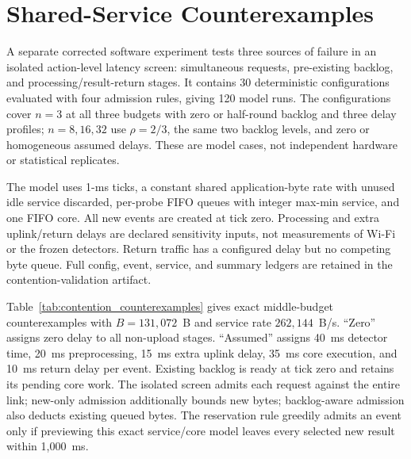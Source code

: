 \documentclass[10pt,onecolumn]{IEEEtran}
\begin{document}
\section{Shared-Service Counterexamples}
\label{sec:contention_validation}
A separate corrected software experiment tests three sources of failure in
an isolated action-level latency screen: simultaneous requests, pre-existing
backlog, and processing/result-return stages. It contains 30 deterministic
configurations evaluated with four admission rules, giving 120 model runs.
The configurations cover $n=3$ at all three budgets with zero or half-round
backlog and three delay profiles; $n=8,16,32$ use $\rho=2/3$, the same two
backlog levels, and zero or homogeneous assumed delays. These are model
cases, not independent hardware or statistical replicates.

The model uses 1-ms ticks, a constant shared application-byte rate with
unused idle service discarded, per-probe FIFO queues with integer max-min
service, and one FIFO core. All new events are created at tick zero.
Processing and extra uplink/return delays are declared sensitivity inputs,
not measurements of Wi-Fi or the frozen detectors. Return traffic has a
configured delay but no competing byte queue. Full config, event, service,
and summary ledgers are retained in the contention-validation artifact.

Table~\ref{tab:contention_counterexamples} gives exact middle-budget
counterexamples with $B=131{,}072$~B and service rate
$262{,}144$~B/s. ``Zero'' assigns zero delay to all non-upload stages.
``Assumed'' assigns 40~ms detector time, 20~ms preprocessing, 15~ms extra
uplink delay, 35~ms core execution, and 10~ms return delay per event. Existing
backlog is ready at tick zero and retains its pending core work. The isolated
screen admits each request against the entire link; new-only admission
additionally bounds new bytes; backlog-aware admission also deducts existing
queued bytes. The reservation rule greedily admits an event only if
previewing this exact service/core model leaves every selected new result
within 1,000~ms.
\end{document}
